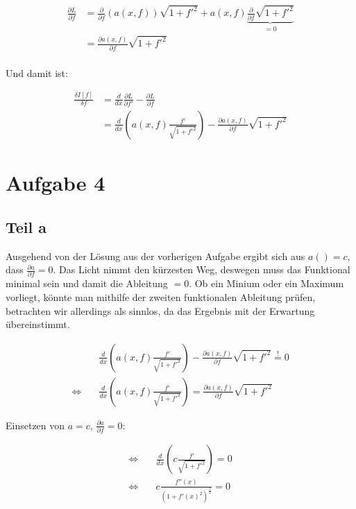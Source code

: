 \documentclass[a4paper,german,12pt,smallheadings]{scrartcl}
\begin{document}
\begin{align*}
  \frac{\partial L}{\partial f} &= \frac{\partial}{\partial f} \left(a(x, f)\right) \sqrt{1+f'^2} + a(x, f) \underbrace{\frac{\partial}{\partial f} \sqrt{1+f'^2}}_{=0} \\
  &= \frac{\partial a(x,f)}{\partial f} \sqrt{1+f'^2} \\
\end{align*}

Und damit ist:

\begin{align*}
  \frac{\delta I[f]}{\delta f} &= \frac{d}{dx} \frac{\partial L}{\partial f'} - \frac{\partial L}{\partial f} \\
  &= \frac{d}{dx} \left(a(x,f) \frac{f'}{\sqrt{1+f'^2}} \right) - \frac{\partial a(x,f)}{\partial f} \sqrt{1+f'^2}
\end{align*}

\section*{Aufgabe 4}
\subsection*{Teil a}

Ausgehend von der Lösung aus der vorherigen Aufgabe ergibt sich aus $a() = c$,
dass $\frac{\partial a}{\partial f} = 0$. Das Licht nimmt den kürzesten Weg,
deswegen muss das Funktional minimal sein und damit die Ableitung $=0$. Ob ein
Minium oder ein Maximum vorliegt, könnte man mithilfe der zweiten funktionalen
Ableitung prüfen, betrachten wir allerdings als sinnlos, da das Ergebnis mit
der Erwartung übereinstimmt.

\begin{align*}
  &\frac{d}{dx} \left(a(x,f) \frac{f'}{\sqrt{1+f'^2}} \right) - \frac{\partial a(x,f)}{\partial f} \sqrt{1+f'^2} \overset{!}{=} 0 \\
  \Leftrightarrow \quad &\frac{d}{dx} \left(a(x,f) \frac{f'}{\sqrt{1+f'^2}} \right) = \frac{\partial a(x,f)}{\partial f} \sqrt{1+f'^2}
\end{align*}

Einsetzen von $a = c$, $\frac{\partial a}{\partial f} = 0$:

\begin{align*}
  \Leftrightarrow \quad &\frac{d}{dx} \left(c \frac{f'}{\sqrt{1+f'^2}} \right) = 0 \\
  \Leftrightarrow \quad &c \frac{f''(x)}{\left(1 + f'(x)^2\right)^{\frac{3}{2}}} = 0
\end{align*}
\end{document}
